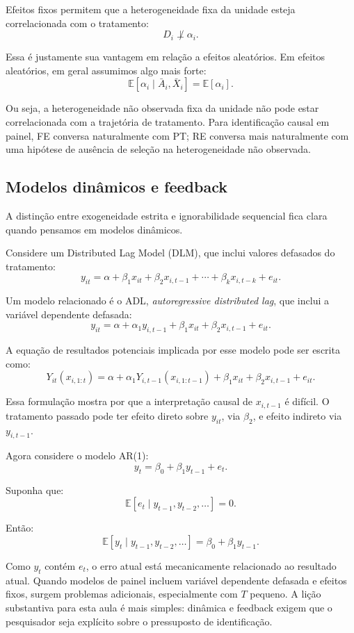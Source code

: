 \documentclass[
]{article}
\begin{document}
Efeitos fixos permitem que a heterogeneidade fixa da unidade esteja correlacionada com o tratamento:
\[
D_i \not\perp \alpha_i.
\]

Essa é justamente sua vantagem em relação a efeitos aleatórios. Em efeitos aleatórios, em geral assumimos algo mais forte:
\[
\mathbb{E}[\alpha_i\mid \bar A_i,\bar X_i]=\mathbb{E}[\alpha_i].
\]

Ou seja, a heterogeneidade não observada fixa da unidade não pode estar correlacionada com a trajetória de tratamento. Para identificação causal em painel, FE conversa naturalmente com PT; RE conversa mais naturalmente com uma hipótese de ausência de seleção na heterogeneidade não observada.

\subsection{Modelos dinâmicos e feedback}\label{modelos-dinuxe2micos-e-feedback}

A distinção entre exogeneidade estrita e ignorabilidade sequencial fica clara quando pensamos em modelos dinâmicos.

Considere um Distributed Lag Model (DLM), que inclui valores defasados do tratamento:
\[
y_{it} = \alpha + \beta_1 x_{it} + \beta_2 x_{i,t-1} + \cdots + \beta_k x_{i,t-k} + e_{it}.
\]

Um modelo relacionado é o ADL, \emph{autoregressive distributed lag}, que inclui a variável dependente defasada:
\[
y_{it} = \alpha + \alpha_1 y_{i,t-1} + \beta_1 x_{it} + \beta_2 x_{i,t-1} + e_{it}.
\]

A equação de resultados potenciais implicada por esse modelo pode ser escrita como:
\[
Y_{it}(x_{i,1:t}) =
\alpha + \alpha_1 Y_{i,t-1}(x_{i,1:t-1})
+ \beta_1x_{it} + \beta_2 x_{i,t-1} + e_{it}.
\]

Essa formulação mostra por que a interpretação causal de \(x_{i,t-1}\) é difícil. O tratamento passado pode ter efeito direto sobre \(y_{it}\), via \(\beta_2\), e efeito indireto via \(y_{i,t-1}\).

Agora considere o modelo AR(1):
\[
y_t = \beta_0 + \beta_1 y_{t-1} + e_t.
\]

Suponha que:
\[
\mathbb{E}[e_t \mid y_{t-1}, y_{t-2}, \ldots] = 0.
\]

Então:
\[
\mathbb{E}[y_t \mid y_{t-1}, y_{t-2}, \ldots]
= \beta_0 + \beta_1 y_{t-1}.
\]

Como \(y_t\) contém \(e_t\), o erro atual está mecanicamente relacionado ao resultado atual. Quando modelos de painel incluem variável dependente defasada e efeitos fixos, surgem problemas adicionais, especialmente com \(T\) pequeno. A lição substantiva para esta aula é mais simples: dinâmica e feedback exigem que o pesquisador seja explícito sobre o pressuposto de identificação.
\end{document}
